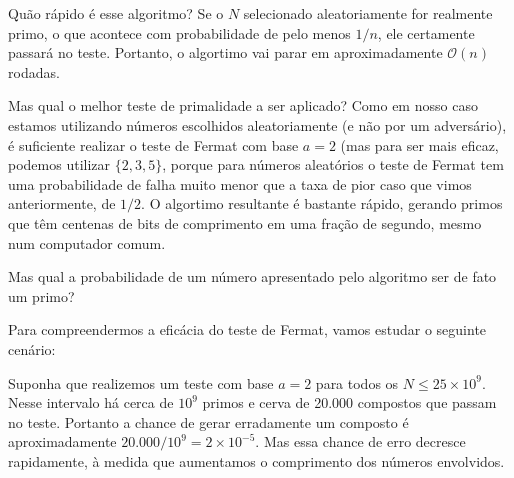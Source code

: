 Quão rápido é esse algoritmo? Se o $N$ selecionado aleatoriamente for
realmente primo, o que acontece com probabilidade de pelo menos $1/n$, ele
certamente passará no teste. Portanto, o algortimo vai parar em
aproximadamente $\mathcal{O}(n)$ rodadas.

Mas qual o melhor teste de primalidade a ser aplicado? Como em nosso caso
estamos utilizando números escolhidos aleatoriamente (e não por um
adversário), é suficiente realizar o teste de Fermat com base $a=2$ (mas para
ser mais eficaz, podemos utilizar $\{2,3,5\}$, porque para números aleatórios
o teste de Fermat tem uma probabilidade de falha muito menor que a taxa de
pior caso que vimos anteriormente, de $1/2$. O algortimo resultante é bastante
rápido, gerando primos que têm centenas de bits de comprimento em uma fração
de segundo, mesmo num computador comum.

Mas qual a probabilidade de um número apresentado pelo algoritmo ser de fato
um primo?

Para compreendermos a eficácia do teste de Fermat, vamos estudar o seguinte
cenário:

Suponha que realizemos um teste com base $a=2$ para todos os $N \leq 25\times
10^9$. Nesse intervalo há cerca de $10^9$ primos e cerva de 20.000 compostos
que passam no teste. Portanto a chance de gerar erradamente um composto é
aproximadamente $20.000/10^9 = 2\times 10^{-5}$. Mas essa chance de erro
decresce rapidamente, à medida que aumentamos o comprimento dos números
envolvidos.
